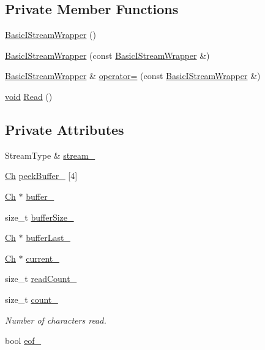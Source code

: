 \subsection*{Private Member Functions}
\begin{DoxyCompactItemize}
\item 
\hyperlink{classBasicIStreamWrapper_a1c72528bd8783cbf79928efbddac0a30}{Basic\+I\+Stream\+Wrapper} ()
\item 
\hyperlink{classBasicIStreamWrapper_a15a415adfc281dc08fe37513f330dc0c}{Basic\+I\+Stream\+Wrapper} (const \hyperlink{classBasicIStreamWrapper}{Basic\+I\+Stream\+Wrapper} \&)
\item 
\hyperlink{classBasicIStreamWrapper}{Basic\+I\+Stream\+Wrapper} \& \hyperlink{classBasicIStreamWrapper_a4a44440921c224c422ec211c9c20e701}{operator=} (const \hyperlink{classBasicIStreamWrapper}{Basic\+I\+Stream\+Wrapper} \&)
\item 
\hyperlink{imgui__impl__opengl3__loader_8h_ac668e7cffd9e2e9cfee428b9b2f34fa7}{void} \hyperlink{classBasicIStreamWrapper_a14f7e115ff06dbf8dda561d156641633}{Read} ()
\end{DoxyCompactItemize}
\subsection*{Private Attributes}
\begin{DoxyCompactItemize}
\item 
Stream\+Type \& \hyperlink{classBasicIStreamWrapper_a08cb5cad6653f35761ef1cdcaa407aa9}{stream\+\_\+}
\item 
\hyperlink{classBasicIStreamWrapper_a88e4288ecdaa0d31ddf4e5917b9aa8d7}{Ch} \hyperlink{classBasicIStreamWrapper_ae85be0f5472085497a21a7e135aba09d}{peek\+Buffer\+\_\+} \mbox{[}4\mbox{]}
\item 
\hyperlink{classBasicIStreamWrapper_a88e4288ecdaa0d31ddf4e5917b9aa8d7}{Ch} $\ast$ \hyperlink{classBasicIStreamWrapper_afcec6ce42add3ff03bbc8f48b1684234}{buffer\+\_\+}
\item 
size\+\_\+t \hyperlink{classBasicIStreamWrapper_a592532cbc0b32f0a7b43800997a898d2}{buffer\+Size\+\_\+}
\item 
\hyperlink{classBasicIStreamWrapper_a88e4288ecdaa0d31ddf4e5917b9aa8d7}{Ch} $\ast$ \hyperlink{classBasicIStreamWrapper_a2e3dcf3716b8525b314b95e4dd67a820}{buffer\+Last\+\_\+}
\item 
\hyperlink{classBasicIStreamWrapper_a88e4288ecdaa0d31ddf4e5917b9aa8d7}{Ch} $\ast$ \hyperlink{classBasicIStreamWrapper_a7c7a177cfffd2793855d160cc0d427c0}{current\+\_\+}
\item 
size\+\_\+t \hyperlink{classBasicIStreamWrapper_aa603c5540319d160fea25702620213ac}{read\+Count\+\_\+}
\item 
size\+\_\+t \hyperlink{classBasicIStreamWrapper_abdc3fc20e4c6e50a8bca468b457b9b79}{count\+\_\+}
\begin{DoxyCompactList}\small\item\em Number of characters read. \end{DoxyCompactList}\item 
bool \hyperlink{classBasicIStreamWrapper_afc35bf604fac076468d3801f85604210}{eof\+\_\+}
\end{DoxyCompactItemize}


